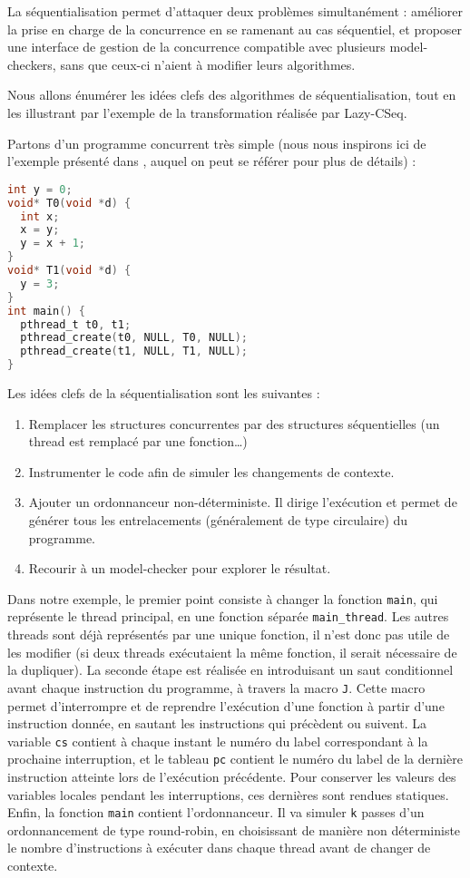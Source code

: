 La séquentialisation permet d'attaquer deux problèmes simultanément : améliorer
la prise en charge de la concurrence en se ramenant au cas séquentiel, et
proposer une interface de gestion de la concurrence compatible avec plusieurs
model-checkers, sans que ceux-ci n'aient à modifier leurs algorithmes.

Nous allons énumérer les idées clefs des algorithmes de séquentialisation, tout
en les illustrant par l'exemple de la transformation réalisée par
Lazy-CSeq\cite{LazyCSeq}.

Partons d'un programme concurrent très simple (nous nous inspirons ici
de l'exemple présenté dans \cite{LazyCSeq}, auquel on peut se
référer pour plus de détails) :

\begin{lstlisting}[language=C, frame=single]
int y = 0;
void* T0(void *d) {
  int x;
  x = y;
  y = x + 1;
}
void* T1(void *d) {
  y = 3;
}
int main() {
  pthread_t t0, t1;
  pthread_create(t0, NULL, T0, NULL);
  pthread_create(t1, NULL, T1, NULL);
}
\end{lstlisting}

Les idées clefs de la séquentialisation sont les suivantes :

\begin{enumerate}
\def\labelenumi{\arabic{enumi})}
\item
  Remplacer les structures concurrentes par des structures séquentielles
  (un thread est remplacé par une fonction\dots)
\item
  Instrumenter le code afin de simuler les changements de contexte.
\item
  Ajouter un ordonnanceur non-déterministe. Il dirige l'exécution et
  permet de générer tous les entrelacements (généralement de type
  circulaire) du programme.
\item
  Recourir à un model-checker pour explorer le résultat.
\end{enumerate}

Dans notre exemple, le premier point consiste à changer la fonction
\texttt{main}, qui représente le thread principal, en une fonction
séparée \texttt{main\_thread}. Les autres threads sont déjà
représentés par une unique fonction, il n'est donc pas utile de les
modifier (si deux threads exécutaient la même fonction, il serait
nécessaire de la dupliquer). La seconde étape est réalisée en
introduisant un saut conditionnel avant chaque instruction du programme,
à travers la macro \texttt{J}. Cette macro permet d'interrompre et de
reprendre l'exécution d'une fonction à partir d'une instruction donnée,
en sautant les instructions qui précèdent ou suivent. La variable
\texttt{cs} contient à chaque instant le numéro du label
correspondant à la prochaine interruption, et le tableau \texttt{pc}
contient le numéro du label de la dernière instruction atteinte lors de
l'exécution précédente. Pour conserver les valeurs des variables locales
pendant les interruptions, ces dernières sont rendues statiques. Enfin,
la fonction \texttt{main} contient l'ordonnanceur. Il va simuler
\texttt{k} passes d'un ordonnancement de type round-robin, en
choisissant de manière non déterministe le nombre d'instructions à
exécuter dans chaque thread avant de changer de contexte.

